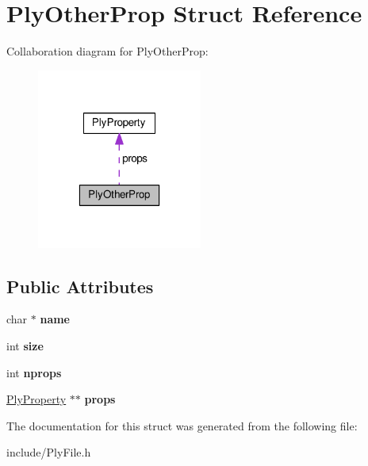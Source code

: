 \hypertarget{structPlyOtherProp}{\section{Ply\-Other\-Prop Struct Reference}
\label{structPlyOtherProp}
}


Collaboration diagram for Ply\-Other\-Prop\-:\nopagebreak
\begin{figure}[H]
\begin{center}
\leavevmode
\includegraphics[width=154pt]{structPlyOtherProp__coll__graph}
\end{center}
\end{figure}
\subsection*{Public Attributes}
\begin{DoxyCompactItemize}
\item 
\hypertarget{structPlyOtherProp_a0804a82b034deb5e259996b8e9270d0c}{char $\ast$ {\bfseries name}}\label{structPlyOtherProp_a0804a82b034deb5e259996b8e9270d0c}

\item 
\hypertarget{structPlyOtherProp_ae7d96d3736cf602e13f2a308249b60ff}{int {\bfseries size}}\label{structPlyOtherProp_ae7d96d3736cf602e13f2a308249b60ff}

\item 
\hypertarget{structPlyOtherProp_aebc7f753bbce55f355e5ade8568c35f7}{int {\bfseries nprops}}\label{structPlyOtherProp_aebc7f753bbce55f355e5ade8568c35f7}

\item 
\hypertarget{structPlyOtherProp_a901cbab454084fb0784975225e9870a8}{\hyperlink{structPlyProperty}{Ply\-Property} $\ast$$\ast$ {\bfseries props}}\label{structPlyOtherProp_a901cbab454084fb0784975225e9870a8}

\end{DoxyCompactItemize}


The documentation for this struct was generated from the following file\-:\begin{DoxyCompactItemize}
\item 
include/Ply\-File.\-h\end{DoxyCompactItemize}
